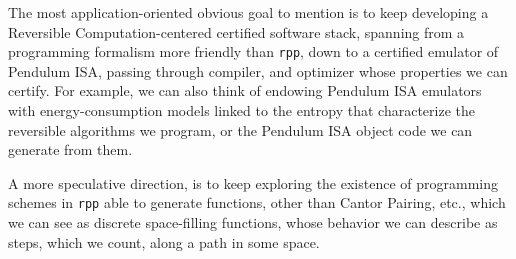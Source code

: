 \documentclass[preprint]{elsarticle}
\theoremstyle{remark}
\newcommand{\PISA}{\textsf{Pendulum ISA}\xspace}
\begin{document}
The most application-oriented obvious goal to mention is to keep developing a Reversible Computa\-tion-centered certified software stack, spanning from a programming formalism more friendly than \lstinline|rpp|, down to a certified emulator of \PISA \cite{Vieri99,vieri1998fully,Ammer2007ASR}, passing through compiler, and optimizer whose properties we can certify. For example, we can also think of endowing \PISA emulators with energy-consumption models linked to the entropy that characterize the reversible algorithms we program, or the \PISA object code we can generate from them.

A more speculative direction, is to keep exploring the existence of programming schemes in \lstinline|rpp| able to generate functions, other than Cantor Pairing, etc., which we can see as discrete space-filling functions, whose behavior we can describe as steps, which we count, along a path in some space.




\end{document}
